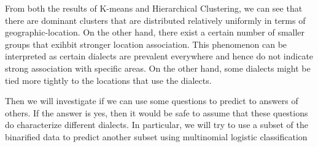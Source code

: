 \documentclass[]{article}
\begin{document}
From both the results of K-means and Hierarchical Clustering, we can see
that there are dominant clusters that are distributed relatively
uniformly in terms of geographic-location. On the other hand, there
exist a certain number of smaller groups that exihbit stronger location
association. This phenomenon can be interpreted as certain dialects are
prevalent everywhere and hence do not indicate strong association with
specific areas. On the other hand, some dialects might be tied more
tightly to the locations that use the dialects.

Then we will investigate if we can use some questions to predict to
answers of others. If the answer is yes, then it would be safe to assume
that these questions do characterize different dialects. In particular,
we will try to use a subset of the binarified data to predict another
subset using multinomial logistic classification
\end{document}
